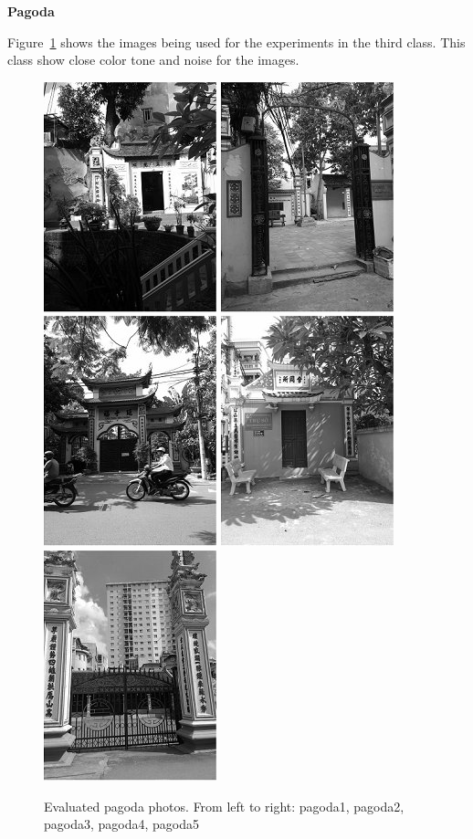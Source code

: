 \newpage

\textbf{Pagoda}

Figure~\ref{fig:pagoda} shows the images being used for the experiments in the third class. This class show close color tone and noise for the images.

\begin{figure}[h]
	\centering
	\includegraphics[width=0.18\columnwidth]{images/pagoda1.jpg}
	\includegraphics[width=0.18\columnwidth]{images/pagoda2.jpg}
	\includegraphics[width=0.18\columnwidth]{images/pagoda3.jpg}
	\includegraphics[width=0.18\columnwidth]{images/pagoda4.jpg}
	\includegraphics[width=0.18\columnwidth]{images/pagoda5.jpg}
	\caption{Evaluated pagoda photos. From left to right: pagoda1, pagoda2, pagoda3, pagoda4, pagoda5}
	\label{fig:pagoda}
\end{figure}


